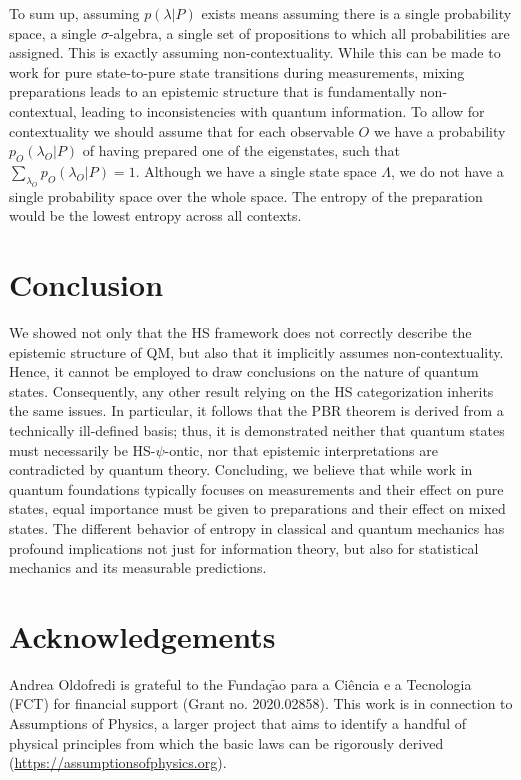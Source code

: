 \documentclass[twocolumn,prl,floatfix,superscriptaddress]{revtex4-2}
\begin{document}
To sum up, assuming $p(\lambda|P)$ exists means assuming there is a single probability space, a single $\sigma$-algebra, a single set of propositions to which all probabilities are assigned. This is exactly assuming non-contextuality. While this can be made to work for pure state-to-pure state transitions during measurements, mixing preparations leads to an epistemic structure that is fundamentally non-contextual, leading to inconsistencies with quantum information. To allow for contextuality we should assume that for each observable $O$ we have a probability $p_O(\lambda_O|P)$ of having prepared one of the eigenstates, such that $\sum_{\lambda_O} p_O(\lambda_O|P) = 1$. Although we have a single state space $\Lambda$, we do not have a single probability space over the whole space. The entropy of the preparation would be the lowest entropy across all contexts.

\section{Conclusion}

We showed not only that the HS framework does not correctly describe the epistemic structure of QM, but also that it implicitly assumes non-contextuality. Hence, it cannot be employed to draw conclusions on the nature of quantum states. Consequently, any other result relying on the HS categorization inherits the same issues. In particular, it follows that the PBR theorem is derived from a technically ill-defined basis; thus, it is demonstrated neither that quantum states must necessarily be HS-$\psi$-ontic, nor that epistemic interpretations are contradicted by quantum theory. Concluding, we believe that while work in quantum foundations typically focuses on measurements and their effect on pure states, equal importance must be given to preparations and their effect on mixed states. The different behavior of entropy in classical and quantum mechanics has profound implications not just for information theory, but also for statistical mechanics and its measurable predictions. 



\section{Acknowledgements}

Andrea Oldofredi is grateful to the Funda\c{c}$\tilde{\mathrm{a}}$o para a Ci\^encia e a Tecnologia (FCT) for financial support (Grant no. 2020.02858).  This work is in connection to Assumptions of Physics, a larger project that aims to identify a handful of physical principles from which the basic laws can be rigorously derived  (\url{https://assumptionsofphysics.org}).

%

\end{document}

